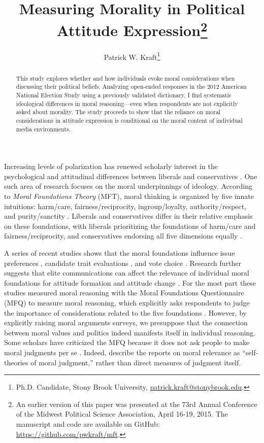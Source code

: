 \documentclass[12pt]{article}
\author{Patrick W. Kraft\footnote{Ph.D. Candidate, Stony Brook University, \href{mailto:patrick.kraft@stonybrook.edu}{patrick.kraft@stonybrook.edu}.
}}
\title{Measuring Morality in Political Attitude Expression\footnote{An earlier version of this paper was presented at the 73rd Annual Conference of the Midwest Political Science Association, April 16-19, 2015. The manuscript and code are available on GitHub: \url{https://github.com/pwkraft/mft}.}}
\begin{document}
\maketitle
\doublespacing
\thispagestyle{empty}

\begin{abstract}
This study explores whether and how individuals evoke moral considerations when discussing their political beliefs. Analyzing open-ended responses in the 2012 American National Election Study using a previously validated dictionary, I find systematic ideological differences in moral reasoning---even when respondents are not explicitly asked about morality. The study proceeds to show that the reliance on moral considerations in attitude expression is conditional on the moral content of individual media environments.

\end{abstract}
\newpage
\setcounter{page}{1}

Increasing levels of polarization has renewed scholarly interest in the psychological and attitudinal differences between liberals and conservatives \citep{jost2006end}. One such area of research focuses on the moral underpinnings of ideology. According to \textit{Moral Foundations Theory} (MFT), moral thinking is organized by five innate intuitions: harm/care, fairness/reciprocity, ingroup/loyalty, authority/respect, and purity/sanctity \citep{haidt2012righteous,graham2013moral}. Liberals and conservatives differ in their relative emphasis on these foundations, with liberals prioritizing the foundations of harm/care and fairness/reciprocity, and conservatives endorsing all five dimensions equally \citep{graham2009liberals}.


A series of recent studies shows that the moral foundations influence issue preferences \citep{koleva2012tracing, kertzer2014moral}, candidate trait evaluations \citep{clifford2014linking}, and vote choice \citep{iyer2010beyond, franks2015using}. Research further suggests that elite communications can affect the relevance of individual moral foundations for attitude formation and attitude change \citep[e.g.][]{clifford2013words,clifford2015concerns,day2014shifting,feinberg2013moral}. For the most part these studies measured moral reasoning with the Moral Foundations Questionnaire (MFQ) to measure moral reasoning, which explicitly asks respondents to judge the importance of considerations related to the five foundations \citep[e.g.][]{graham2011mapping}. However, by explicitly raising moral arguments surveys, we presuppose that the connection between moral values and politics indeed manifests itself in individual reasoning. Some scholars have criticized the MFQ because it does not ask people to make moral judgments per se \citep[e.g.][]{clifford2015moral}. Indeed, \citet[1031]{graham2009liberals} describe the reports on moral relevance as ``self-theories of moral judgment,'' rather than direct measures of judgment itself.
\end{document}

